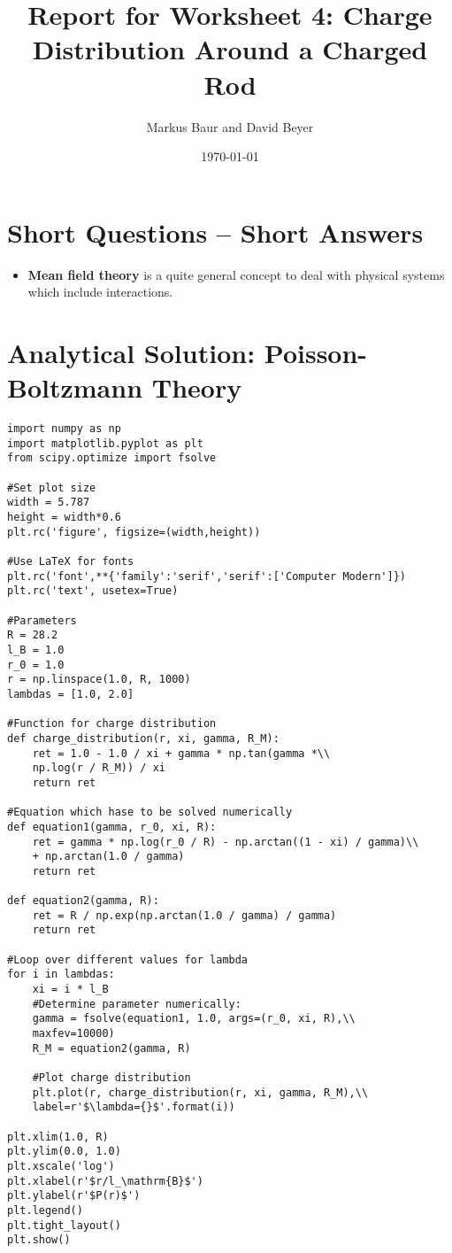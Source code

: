 \documentclass[a4paper,10pt,bibtotoc]{scrartcl}
\begin{document}
\titlehead{Simulation Methods in Physics II \hfill SS 2020}
\title{Report for Worksheet 4: Charge Distribution Around a Charged Rod}
\author{Markus Baur and David Beyer}
\date{\today}
\maketitle

\tableofcontents

\section{Short Questions -- Short Answers}
\begin{itemize}
 \item \textbf{Mean field theory} is a quite general concept to deal with physical systems which include interactions.
\end{itemize}


\section{Analytical Solution: Poisson-Boltzmann Theory}
\begin{lstlisting}
import numpy as np
import matplotlib.pyplot as plt
from scipy.optimize import fsolve

#Set plot size
width = 5.787
height = width*0.6
plt.rc('figure', figsize=(width,height))

#Use LaTeX for fonts
plt.rc('font',**{'family':'serif','serif':['Computer Modern']})
plt.rc('text', usetex=True)

#Parameters
R = 28.2
l_B = 1.0
r_0 = 1.0
r = np.linspace(1.0, R, 1000)
lambdas = [1.0, 2.0]

#Function for charge distribution
def charge_distribution(r, xi, gamma, R_M):
    ret = 1.0 - 1.0 / xi + gamma * np.tan(gamma *\\
    np.log(r / R_M)) / xi
    return ret

#Equation which hase to be solved numerically
def equation1(gamma, r_0, xi, R):
    ret = gamma * np.log(r_0 / R) - np.arctan((1 - xi) / gamma)\\
    + np.arctan(1.0 / gamma)
    return ret

def equation2(gamma, R):
    ret = R / np.exp(np.arctan(1.0 / gamma) / gamma)
    return ret

#Loop over different values for lambda
for i in lambdas:
    xi = i * l_B
    #Determine parameter numerically:
    gamma = fsolve(equation1, 1.0, args=(r_0, xi, R),\\
    maxfev=10000)
    R_M = equation2(gamma, R)
    
    #Plot charge distribution
    plt.plot(r, charge_distribution(r, xi, gamma, R_M),\\
    label=r'$\lambda={}$'.format(i))

plt.xlim(1.0, R)
plt.ylim(0.0, 1.0)
plt.xscale('log')
plt.xlabel(r'$r/l_\mathrm{B}$')
plt.ylabel(r'$P(r)$')
plt.legend()
plt.tight_layout()
plt.show()
\end{lstlisting}
\end{document}
